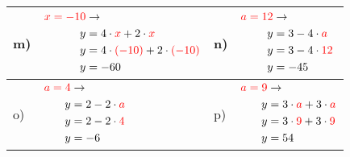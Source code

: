 \documentclass[12pt]{article}
\begin{document}
\begin{xltabular}{\textwidth}{|C{0.75cm}|X|C{0.75cm}|X|}
m)&$\begin{aligned}
\textcolor{red}{x=-10} & \rightarrow\\
y&=4 \cdot \textcolor{red}{x} + 2 \cdot \textcolor{red}{x}\\
y&=4 \cdot \textcolor{red}{(-10)} + 2 \cdot \textcolor{red}{(-10)}\\
y&=-60\\
\end{aligned}$
&
n)&$\begin{aligned}
\textcolor{red}{a=12} & \rightarrow\\
y&=3 - 4 \cdot \textcolor{red}{a}\\
y&=3 - 4 \cdot \textcolor{red}{12}\\
y&=-45\\
\end{aligned}$
\\\hline
o)&$\begin{aligned}
\textcolor{red}{a=4} & \rightarrow\\
y&=2 - 2 \cdot \textcolor{red}{a}\\
y&=2 - 2 \cdot \textcolor{red}{4}\\
y&=-6\\
\end{aligned}$
&
p)&$\begin{aligned}
\textcolor{red}{a=9} & \rightarrow\\
y&=3 \cdot \textcolor{red}{a} + 3 \cdot \textcolor{red}{a}\\
y&=3 \cdot \textcolor{red}{9} + 3 \cdot \textcolor{red}{9}\\
y&=54\\
\end{aligned}$
\\\hline
\end{xltabular}
\vspace{0.5cm}
\end{document}
